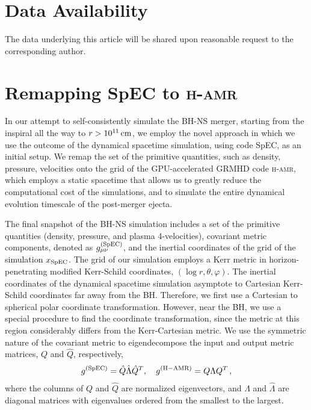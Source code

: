 \documentclass[twocolumn,dvipsnames]{aastex62}
\begin{document}
\section*{Data Availability}

The data underlying this article will be shared upon reasonable request to the corresponding author.



\appendix

\section{Remapping SpEC to \textsc{h-amr}} \label{sec:remap}

In our attempt to self-consistently simulate the BH-NS merger, starting from the inspiral all the way to $ r > 10^{11}\,{\rm cm} $, we employ the novel approach in which we use the outcome of the dynamical spacetime simulation, using code SpEC, as an initial setup. We remap the set of the primitive quantities, such as density, pressure, velocities onto the grid of the GPU-accelerated GRMHD code \textsc{h-amr}, which employs a static spacetime that allows us to greatly reduce the computational cost of the simulations, and to simulate the entire dynamical evolution timescale of the post-merger ejecta.

The final snapshot of the BH-NS simulation includes a set of the primitive quantities (density, pressure, and plasma 4-velocities), covariant metric components, denoted as $g_{\mu\nu}^{\rm(SpEC)}$, and the inertial coordinates of the grid of the simulation $x_{\rm SpEC}$. The grid of our simulation employs a Kerr metric in horizon-penetrating modified Kerr-Schild coordinates, $(\log r, \theta, \varphi)$. The inertial coordinates of the dynamical spacetime simulation asymptote to Cartesian Kerr-Schild coordinates far away from the BH. Therefore, we first use a Cartesian to spherical polar coordinate transformation. However, near the BH, we use a special procedure to find the coordinate transformation, since the metric at this region considerably differs from the Kerr-Cartesian metric.
We use the symmetric nature of the covariant metric to eigendecompose the input and output metric matrices, $Q$ and $\hat{Q}$, respectively,
\begin{equation}
    g^{\rm (SpEC)} = \hat{Q}\hat{\Lambda}\hat{Q}^T, \quad g^{\rm (H-AMR)} = Q\Lambda Q^T\,,
    \label{eqn:symm_matrix}
\end{equation}
where the columns of $Q$ and $\hat{Q}$ are normalized eigenvectors, and $\Lambda$ and $\hat{\Lambda}$ are diagonal matrices with eigenvalues ordered from the smallest to the largest.
\end{document}
